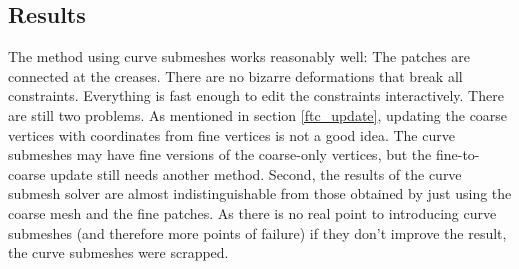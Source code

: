 \documentclass[a4paper,twoside,12pt,nochapterprefix]{scrbook}
\begin{document}
\subsection{Results}
The method using curve submeshes works reasonably well: The patches are connected at the creases. There are no bizarre deformations that break all constraints. Everything is fast enough to edit the constraints interactively. There are still two problems.\newline
As mentioned in section \ref{ftc_update}, updating the coarse vertices with coordinates from fine vertices is not a good idea. The curve submeshes may have fine versions of the coarse-only vertices, but the fine-to-coarse update still needs another method.\newline
Second, the results of the curve submesh solver are almost indistinguishable from those obtained by just using the coarse mesh and the fine patches. As there is no real point to introducing curve submeshes (and therefore more points of failure) if they don't improve the result, the curve submeshes were scrapped.\newline
\end{document}
